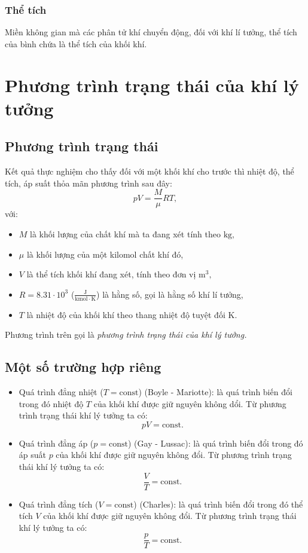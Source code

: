 \subsubsection{Thể tích}
Miền không gian mà các phân tử khí chuyển động, đối với khí lí tưởng, thể tích của bình chứa là thể tích của khối khí.
\section{Phương trình trạng thái của khí lý tưởng}
\subsection{Phương trình trạng thái}
Kết quả thực nghiệm cho thấy đối với một khối khí cho trước thì nhiệt độ, thể tích, áp suất thỏa mãn phương trình sau đây:
$$ pV = \frac{M}{\mu}RT,$$
với:
\begin{itemize}
\item $M$ là khối lượng của chất khí mà ta đang xét tính theo $\mathrm{kg},$
\item $\mu$ là khối lượng của một kilomol chất khí đó,
\item $V$ là thể tích khối khí đang xét, tính theo đơn vị $\mathrm{m^3},$
\item $R = 8.31 \cdot 10^3$ ($\mathrm{\frac{J}{kmol \cdot K}}$) là hằng số, gọi là hằng số khí lí tưởng,
\item $T$ là nhiệt độ của khối khí theo thang nhiệt độ tuyệt đối $\mathrm{K}.$ 
\end{itemize}
Phương trình trên gọi là \textit{phương trình trạng thái của khí lý tưởng.}
\subsection{Một số trường hợp riêng}
\begin{itemize}
\item Quá trình đẳng nhiệt ($T = \mathrm{const}$) (Boyle - Mariotte): là quá trình biến đổi trong đó nhiệt độ $T$ của khối khí được giữ nguyên không dổi. Từ phương trình trạng thái khí lý tưởng ta có:
$$pV = \mathrm{const}.$$
\item Quá trình đẳng áp ($p = \mathrm{const}$) (Gay - Lussac): là quá trình biến đổi trong đó áp suất $p$ của khối khí được giữ nguyên không đổi. Từ phương trình trạng thái khí lý tưởng ta có:
$$\frac{V}{T} = \mathrm{const}.$$
\item Quá trình đẳng tích ($V = \mathrm{const}$) (Charles): là quá trình biến đổi trong đó thể tích $V$ của khối khí được giữ nguyên không đổi. Từ phương trình trạng thái khí lý tưởng ta có:
$$\frac{p}{T} = \mathrm{const}.$$
\end{itemize}
